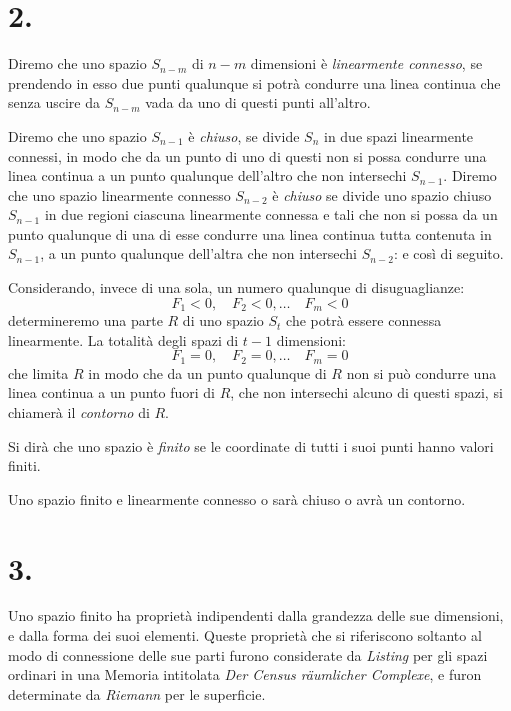 \documentclass{article}
\begin{document}
\section*{2.}

Diremo che uno spazio $S_{n-m}$ di $n-m$ dimensioni è \emph{linearmente connesso}, se prendendo in esso due punti qualunque si potrà condurre una linea continua che senza uscire da $S_{n-m}$ vada da uno di questi punti all'altro.


Diremo che uno spazio $S_{n-1}$ è \emph{chiuso}, se divide $S_{n}$ in due spazi linearmente connessi, in modo che da un punto di uno di questi non si possa condurre una linea continua a un punto qualunque dell'altro che non intersechi $S_{n-1}$. Diremo che uno spazio linearmente connesso $S_{n-2}$ è \emph{chiuso} se divide uno spazio chiuso $S_{n-1}$ in due regioni ciascuna linearmente connessa e tali che non si possa da un punto qualunque di una di esse condurre una linea continua tutta contenuta in $S_{n-1}$, a un punto qualunque dell'altra che non intersechi $S_{n-2}$: e così di seguito.

Considerando, invece di una sola, un numero qualunque di disuguaglianze:
\[ F_{1} < 0, \quad F_{2} < 0,\ldots \quad F_{m} < 0 \]
determineremo una parte $R$ di uno spazio $S_{t}$ che potrà essere connessa linearmente. La totalità degli spazi di $t-1$ dimensioni:
\[ F_{1} = 0, \quad F_{2} = 0,\ldots \quad F_{m} = 0 \]
che limita $R$ in modo che da un punto qualunque di $R$ non si può condurre una linea continua a un punto fuori di $R$, che non intersechi alcuno di questi spazi, si chiamerà il \emph{contorno} di $R$.

Si dirà che uno spazio è \emph{finito} se le coordinate di tutti i suoi punti hanno valori finiti.

Uno spazio finito e linearmente connesso o sarà chiuso o avrà un contorno.

\section*{3.}

Uno spazio finito ha proprietà indipendenti dalla grandezza delle sue dimensioni, e dalla forma dei suoi elementi. Queste proprietà che si riferiscono soltanto al modo di connessione delle sue parti furono considerate da \emph{Listing} per gli spazi ordinari in una Memoria intitolata \emph{Der Census räumlicher Complexe}, e furon determinate da \emph{Riemann} per le superficie.
\end{document}
